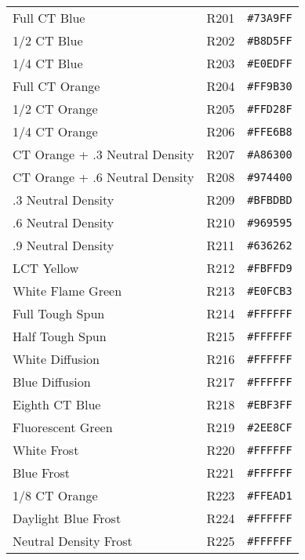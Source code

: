 \documentclass[a4paper]{article}
\begin{document}
\begin{longtable}{|l|l|r|}
Full CT Blue & R201 & \texttt{\#73A9FF} \cellcolor[HTML]{73A9FF} \\
1/2 CT Blue & R202 & \texttt{\#B8D5FF} \cellcolor[HTML]{B8D5FF} \\
1/4 CT Blue & R203 & \texttt{\#E0EDFF} \cellcolor[HTML]{E0EDFF} \\
Full CT Orange & R204 & \texttt{\#FF9B30} \cellcolor[HTML]{FF9B30} \\
1/2 CT Orange & R205 & \texttt{\#FFD28F} \cellcolor[HTML]{FFD28F} \\
1/4 CT Orange & R206 & \texttt{\#FFE6B8} \cellcolor[HTML]{FFE6B8} \\
CT Orange + .3 Neutral Density & R207 & \texttt{\#A86300} \cellcolor[HTML]{A86300} \\
CT Orange + .6 Neutral Density & R208 & \texttt{\#974400} \cellcolor[HTML]{974400} \\
.3 Neutral Density & R209 & \texttt{\#BFBDBD} \cellcolor[HTML]{BFBDBD} \\
.6 Neutral Density & R210 & \texttt{\#969595} \cellcolor[HTML]{969595} \\
.9 Neutral Density & R211 & \texttt{\#636262} \cellcolor[HTML]{636262} \\
LCT Yellow & R212 & \texttt{\#FBFFD9} \cellcolor[HTML]{FBFFD9} \\
White Flame Green & R213 & \texttt{\#E0FCB3} \cellcolor[HTML]{E0FCB3} \\
Full Tough Spun & R214 & \texttt{\#FFFFFF} \cellcolor[HTML]{FFFFFF} \\
Half Tough Spun & R215 & \texttt{\#FFFFFF} \cellcolor[HTML]{FFFFFF} \\
White Diffusion & R216 & \texttt{\#FFFFFF} \cellcolor[HTML]{FFFFFF} \\
Blue Diffusion & R217 & \texttt{\#FFFFFF} \cellcolor[HTML]{FFFFFF} \\
Eighth CT Blue  & R218 & \texttt{\#EBF3FF} \cellcolor[HTML]{EBF3FF} \\
Fluorescent Green  & R219 & \texttt{\#2EE8CF} \cellcolor[HTML]{2EE8CF} \\
White Frost & R220 & \texttt{\#FFFFFF} \cellcolor[HTML]{FFFFFF} \\
Blue Frost & R221 & \texttt{\#FFFFFF} \cellcolor[HTML]{FFFFFF} \\
1/8 CT Orange & R223 & \texttt{\#FFEAD1} \cellcolor[HTML]{FFEAD1} \\
Daylight Blue Frost & R224 & \texttt{\#FFFFFF} \cellcolor[HTML]{FFFFFF} \\
Neutral Density Frost & R225 & \texttt{\#FFFFFF} \cellcolor[HTML]{FFFFFF} \\

\end{longtable}
\end{document}
